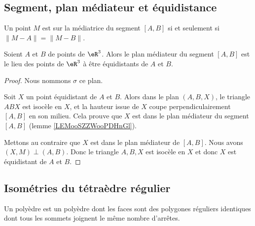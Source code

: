 \subsection{Segment, plan médiateur et équidistance}

\begin{lemma}   \label{LEMooSZZWooPDHnGl}
    Un point \( M\) est sur la médiatrice du segment \( [A,B]\) si et seulement si \( \| M-A \|=\| M-B \|\).
\end{lemma}

\begin{lemma}       \label{LEMooVBVUooOTFFXT}
    Soient \( A\) et \( B\) de points de \( \eR^3\). Alors le plan médiateur du segment \( [A,B]\) est le lieu des points de \( \eR^3\) à être équidistants de \( A\) et \( B\).
\end{lemma}

\begin{proof}
    Nous nommons \( \sigma\) ce plan.

    Soit \( X\) un point équidistant de \( A\) et \( B\). Alors dans le plan \( (A,B,X)\), le triangle \( ABX\) est isocèle en \( X\), et la hauteur issue de \( X\) coupe perpendiculairement \( [A,B]\) en son milieu. Cela prouve que \( X\) est dans le plan médiateur du segment \( [A,B]\) (lemme \ref{LEMooSZZWooPDHnGl}).

    Mettons au contraire que \( X\) est dans le plan médiateur de \( [A,B]\). Nous avons \( (X,M)\perp (A,B)\). Donc le triangle \( A,B,X\) est isocèle en \( X\) et donc \( X\) est équidistant de \( A\) et \( B\).
\end{proof}

\subsection{Isométries du tétraèdre régulier}

\begin{definition}
    Un polyèdre  est un polyèdre dont les faces sont des polygones réguliers identiques dont tous les sommets joignent le même nombre d'arrêtes.
\end{definition}

